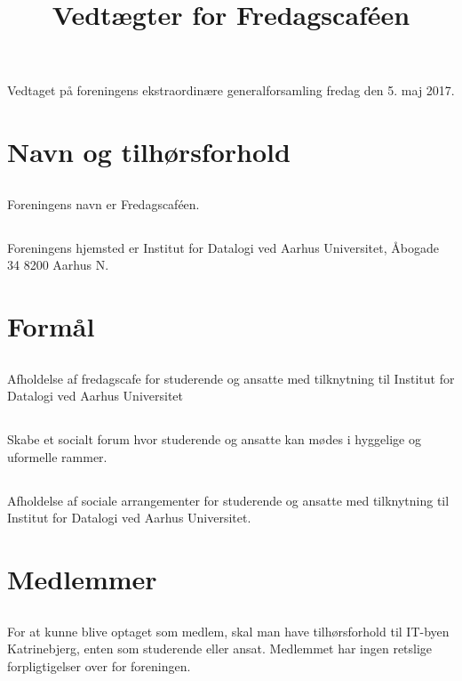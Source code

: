 \documentclass[danish,a4paper,twocolumn,oneside,article]{memoir}
\title{Vedtægter for Fredagscaféen}
\author{}
\date{}
\begin{document}
\maketitle
\newpage

Vedtaget på foreningens ekstraordinære generalforsamling fredag den 5. maj 2017.

\chapter{Navn og tilhørsforhold} 

\section{} Foreningens navn er Fredagscaféen.

\section{} Foreningens hjemsted er Institut for Datalogi ved Aarhus Universitet, Åbogade 34 8200 Aarhus N.

\chapter{Formål}

\section{} Afholdelse af fredagscafe for studerende og ansatte med tilknytning til Institut for Datalogi 
ved Aarhus Universitet

\section{} Skabe et socialt forum hvor studerende og ansatte kan mødes i hyggelige og uformelle rammer.

\section{} Afholdelse af sociale arrangementer for studerende og ansatte med tilknytning til Institut for Datalogi
ved Aarhus Universitet.


\chapter{Medlemmer}

\section{} For at kunne blive optaget som medlem, skal man have tilhørsforhold til IT-byen Katrinebjerg,
enten som studerende eller ansat. Medlemmet har ingen retslige forpligtigelser over for foreningen.
\end{document}
